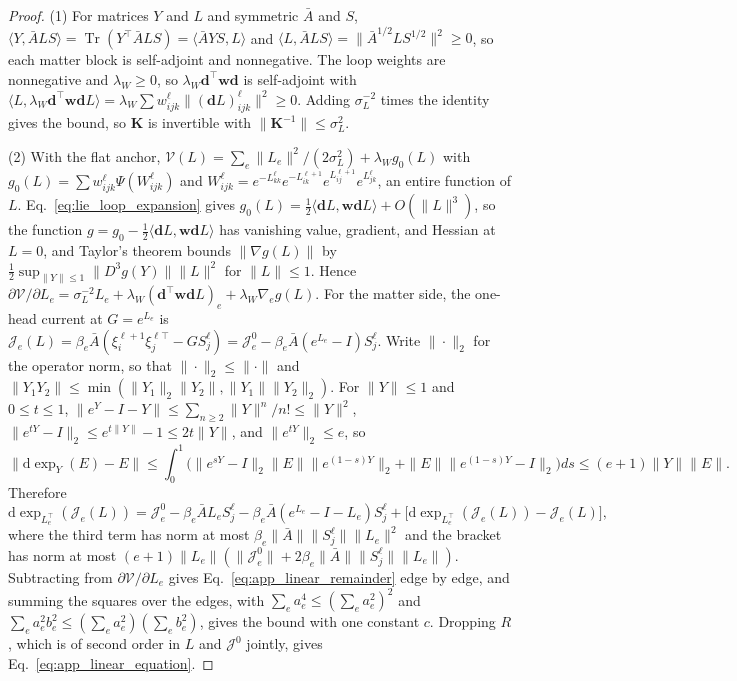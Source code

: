 \documentclass[twoside,11pt]{article}
\begin{document}
\begin{proof}
(1) For matrices $Y$ and $L$ and symmetric $\bar A$ and $S$, $\langle Y,\bar ALS\rangle=\operatorname{Tr}(Y^\top\bar ALS)=\langle\bar AYS,L\rangle$ and $\langle L,\bar ALS\rangle=\|\bar A^{1/2}LS^{1/2}\|^2\ge0$, so each matter block is self-adjoint and nonnegative. The loop weights are nonnegative and $\lambda_W\ge0$, so $\lambda_W\mathbf d^\top\mathbf w\mathbf d$ is self-adjoint with $\langle L,\lambda_W\mathbf d^\top\mathbf w\mathbf dL\rangle=\lambda_W\sum w_{ijk}^\ell\|(\mathbf dL)_{ijk}^\ell\|^2\ge0$. Adding $\sigma_L^{-2}$ times the identity gives the bound, so $\mathbf K$ is invertible with $\|\mathbf K^{-1}\|\le\sigma_L^2$.

(2) With the flat anchor, $\mathcal V(L)=\sum_e\|L_e\|^2/(2\sigma_L^2)+\lambda_Wg_0(L)$ with $g_0(L)=\sum w_{ijk}^\ell\Psi(W_{ijk}^\ell)$ and $W_{ijk}^\ell=e^{-L_{kk}^\ell}e^{-L_{ik}^{\ell+1}}e^{L_{ij}^{\ell+1}}e^{L_{jk}^\ell}$, an entire function of $L$. Eq.~\eqref{eq:lie_loop_expansion} gives $g_0(L)=\tfrac12\langle\mathbf dL,\mathbf w\mathbf dL\rangle+O(\|L\|^3)$, so the function $g=g_0-\tfrac12\langle\mathbf dL,\mathbf w\mathbf dL\rangle$ has vanishing value, gradient, and Hessian at $L=0$, and Taylor's theorem bounds $\|\nabla g(L)\|$ by $\tfrac12\sup_{\|Y\|\le1}\|D^3g(Y)\|\|L\|^2$ for $\|L\|\le1$. Hence $\partial \mathcal V/\partial L_e=\sigma_L^{-2}L_e+\lambda_W(\mathbf d^\top\mathbf w\mathbf dL)_e+\lambda_W\nabla_eg(L)$. For the matter side, the one-head current at $G=e^{L_e}$ is $\mathcal J_e(L)=\beta_e\bar A(\xi_i^{\ell+1}\xi_j^{\ell\top}-GS_j^\ell)=\mathcal J_e^0-\beta_e\bar A(e^{L_e}-I)S_j^\ell$. Write $\|\cdot\|_2$ for the operator norm, so that $\|\cdot\|_2\le\|\cdot\|$ and $\|Y_1Y_2\|\le\min(\|Y_1\|_2\|Y_2\|,\|Y_1\|\|Y_2\|_2)$. For $\|Y\|\le1$ and $0\le t\le1$, $\|e^Y-I-Y\|\le\sum_{n\ge2}\|Y\|^n/n!\le\|Y\|^2$, $\|e^{tY}-I\|_2\le e^{t\|Y\|}-1\le2t\|Y\|$, and $\|e^{tY}\|_2\le e$, so
\begin{equation*}
\bigl\|\mathrm d\exp_{Y}(E)-E\bigr\|\le\int_0^1\bigl(\|e^{sY}-I\|_2\|E\|\|e^{(1-s)Y}\|_2+\|E\|\|e^{(1-s)Y}-I\|_2\bigr)ds\le(e+1)\|Y\|\|E\|.
\end{equation*}
Therefore
\begin{equation*}
\mathrm d\exp_{L_e^\top}(\mathcal J_e(L))=\mathcal J_e^0-\beta_e\bar AL_eS_j^\ell-\beta_e\bar A(e^{L_e}-I-L_e)S_j^\ell+\bigl[\mathrm d\exp_{L_e^\top}(\mathcal J_e(L))-\mathcal J_e(L)\bigr],
\end{equation*}
where the third term has norm at most $\beta_e\|\bar A\|\|S_j^\ell\|\|L_e\|^2$ and the bracket has norm at most $(e+1)\|L_e\|(\|\mathcal J_e^0\|+2\beta_e\|\bar A\|\|S_j^\ell\|\|L_e\|)$. Subtracting from $\partial \mathcal V/\partial L_e$ gives Eq.~\eqref{eq:app_linear_remainder} edge by edge, and summing the squares over the edges, with $\sum_ea_e^4\le(\sum_ea_e^2)^2$ and $\sum_ea_e^2b_e^2\le(\sum_ea_e^2)(\sum_eb_e^2)$, gives the bound with one constant $c$. Dropping $R$, which is of second order in $L$ and $\mathcal J^0$ jointly, gives Eq.~\eqref{eq:app_linear_equation}.


\end{proof}
\end{document}
